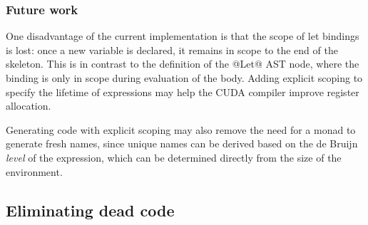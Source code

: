 %
%
%


\subsubsection{Future work}

One disadvantage of the current implementation is that the scope of let bindings
is lost: once a new variable is declared, it remains in scope to the end of the
skeleton. This is in contrast to the definition of the @Let@ AST node, where the
binding is only in scope during evaluation of the body. Adding explicit scoping
to specify the lifetime of expressions may help the CUDA compiler improve
register allocation.


Generating code with explicit scoping may also remove the need for a monad to
generate fresh names, since unique names can be derived based on the de Bruijn
\emph{level} of the expression, which can be determined directly from the size
of the environment.


\cg[sharing|)]{}

\subsection{Eliminating dead code}
\label{sec:eliminating_dead_code}

